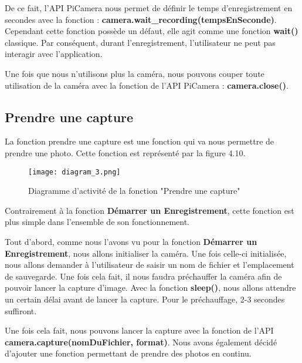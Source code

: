            De ce fait, l'API PiCamera nous permet de définir le temps d'enregistrement en secondes avec la fonction : \textbf{camera.wait\_recording(tempsEnSeconde)}. Cependant cette fonction possède un défaut, elle agit comme une fonction \textbf{wait()} classique. Par conséquent, durant l'enregistrement, l'utilisateur ne peut pas interagir avec l'application. 
            
            \vspace{0.4cm}

            Une fois que nous n'utilisons plus la caméra, nous pouvons couper toute utilisation de la caméra avec la fonction de l'API PiCamera : \textbf{camera.close()}.
            
        \subsection{Prendre une capture}
        La fonction prendre une capture est une fonction qui va nous permettre de prendre une photo.
        Cette fonction est représenté par la figure 4.10.
        \begin{figure}[ht]
            \centering
            \texttt{[image: diagram\_3.png]} 
            \caption{Diagramme d'activité de la fonction "Prendre une capture"}
        \end{figure}

        Contrairement à la fonction \textbf{Démarrer un Enregistrement}, cette fonction est plus simple dans l'ensemble de son fonctionnement. 
        
        \vspace{0.2cm}

        Tout d'abord, comme nous l'avons vu pour la fonction \textbf{Démarrer un Enregistrement}, nous allons initialiser la caméra. Une fois celle-ci initialisée, nous allons demander à l'utilisateur de saisir un nom de fichier et l'emplacement de sauvegarde. Une fois cela fait, il nous faudra préchauffer la caméra afin de pouvoir lancer la capture d'image. Avec la fonction \textbf{sleep()}, nous allons attendre un certain délai avant de lancer la capture.
        Pour le préchauffage, 2-3 secondes suffiront.

        \vspace{0.2cm}

        Une fois cela fait, nous pouvons lancer la capture avec la fonction de l'API \textbf{camera.capture(nomDuFichier, format)}. Nous avons également décidé d'ajouter une fonction permettant de prendre des photos en continu.


